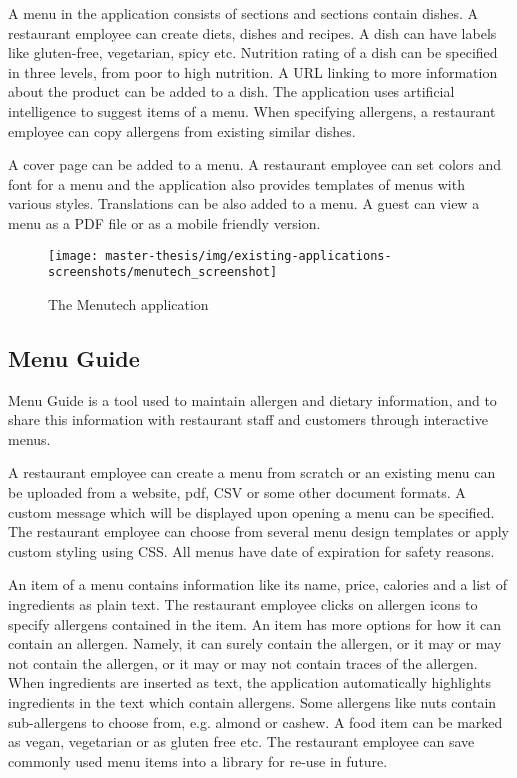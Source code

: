   A menu in the application consists of sections and sections contain dishes.
  A restaurant employee can create diets, dishes and recipes.
  A dish can have labels like gluten-free, vegetarian, spicy etc.
  Nutrition rating of a dish can be specified in three levels, from poor to high nutrition.
  A URL linking to more information about the product can be added to a dish.
  The application uses artificial intelligence to suggest items of a menu.
  When specifying allergens, a restaurant employee can copy allergens from existing similar dishes.

  A cover page can be added to a menu.
  A restaurant employee can set colors and font for a menu and the application also provides templates of menus with various styles.
  Translations can be also added to a menu.
  A guest can view a menu as a PDF file or as a mobile friendly version.

  \begin{figure}[h]
    \centering
    \texttt{[image: master-thesis/img/existing-applications-screenshots/menutech\_screenshot]}
    \caption{The Menutech application}
  \end{figure}

\subsection*{Menu Guide}
  Menu Guide is a tool used to maintain allergen and dietary information, and to share this information with restaurant staff and customers through interactive menus.

  A restaurant employee can create a menu from scratch or an existing menu can be uploaded from a website, pdf, CSV or some other document formats. 
  A custom message which will be displayed upon opening a menu can be specified.
  The restaurant employee can choose from several menu design templates or apply custom styling using CSS.
  All menus have date of expiration for safety reasons.

  An item of a menu contains information like its name, price, calories and a list of ingredients as plain text.
  The restaurant employee clicks on allergen icons to specify allergens contained in the item.
  An item has more options for how it can contain an allergen. 
  Namely, it can surely contain the allergen, or it may or may not contain the allergen, or it may or may not contain traces of the allergen.
  When ingredients are inserted as text, the application automatically highlights ingredients in the text which contain allergens.
  Some allergens like nuts contain sub-allergens to choose from, e.g. almond or cashew.
  A food item can be marked as vegan, vegetarian or as gluten free etc.
  The restaurant employee can save commonly used menu items into a library for re-use in future. 

